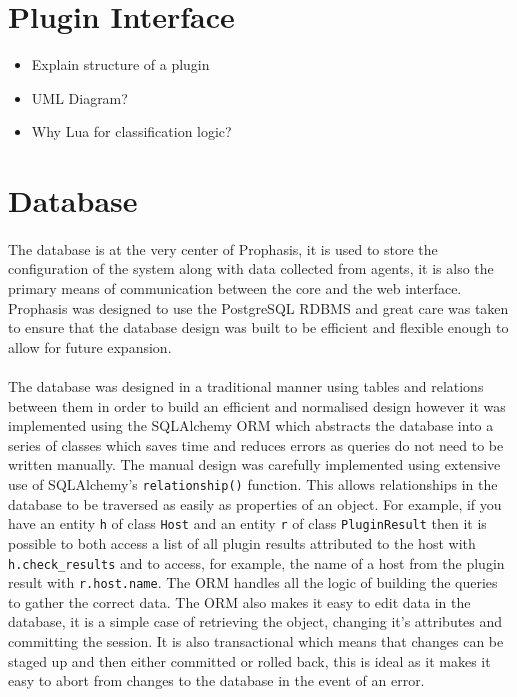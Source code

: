 \documentclass[bsc,logo,twoside]{infthesis}
\begin{document}
\section{Plugin Interface}
\begin{itemize}
	\item Explain structure of a plugin
	\item UML Diagram?
	\item Why Lua for classification logic?
\end{itemize}

\section{Database}
\paragraph*{}
	The database is at the very center of Prophasis, it is used to store the
	configuration of the system along with data collected from agents, it is also
	the primary means of communication between the core and the web interface.
	Prophasis was designed to use the PostgreSQL RDBMS and great care was taken to
	ensure that the database design was built to be efficient and flexible enough
	to allow for future expansion.
	
\paragraph*{}
	The database was designed in a traditional manner using tables and relations
	between them in order to build an efficient and normalised design however it
	was implemented using the SQLAlchemy ORM which abstracts the database into a
	series of classes which saves time and reduces errors as queries do not need
	to be written manually.  The manual design was carefully implemented using
	extensive use of SQLAlchemy's \texttt{relationship()} function.  This allows
	relationships in the database to be traversed as easily as properties of an
	object.  For example, if you have an entity \texttt{h} of class \texttt{Host}
	and an entity \texttt{r} of class \texttt{PluginResult} then it is possible
	to both access a list of all plugin results attributed to the host with
	\texttt{h.check\_results} and to access, for example, the name of a host
	from the plugin result with \texttt{r.host.name}.  The ORM handles all the
	logic of building the queries to gather the correct data.  The ORM also makes
	it easy to edit data in the database, it is a simple case of retrieving the
	object, changing it's attributes and committing the session.  It is also
	transactional which means that changes can be staged up and then either
	committed or rolled back, this is ideal as it makes it easy to abort from
	changes to the database in the event of an error.
	
\end{document}
